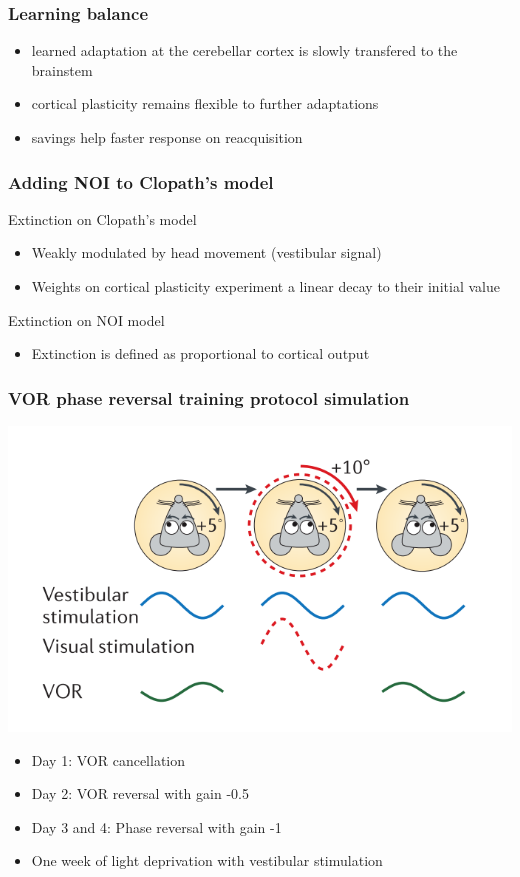 \documentclass[10pt, compress]{beamer}
\begin{document}
\begin{frame}[fragile]
  \frametitle{Learning balance}
  \begin{itemize}
    \item learned adaptation at the cerebellar cortex is slowly transfered to the brainstem
    \item cortical plasticity remains flexible to further adaptations
    \item savings help faster response on reacquisition
  \end{itemize}
\end{frame}

\begin{frame}[fragile]
  \frametitle{Adding NOI to Clopath's model}
  Extinction on Clopath's model
  \begin{itemize}
    \item Weakly modulated by head movement (vestibular signal)
    \item Weights on cortical plasticity experiment a linear decay to their initial value
  \end{itemize}
  Extinction on NOI model
  \begin{itemize}
    \item Extinction is defined as proportional to cortical output \cite{Najac2015}
  \end{itemize}
\end{frame}

\begin{frame}[fragile]
  \frametitle{VOR phase reversal training protocol simulation}
  \includegraphics[scale=0.25]{images/vor_adaptation.png}

  \cite{Gao2012a}
  \begin{itemize}
    \item Day 1: VOR cancellation
    \item Day 2: VOR reversal with gain -0.5
    \item Day 3 and 4: Phase reversal with gain -1
    \pause
    \item One week of light deprivation with vestibular stimulation
  \end{itemize}
\end{frame}
\end{document}
